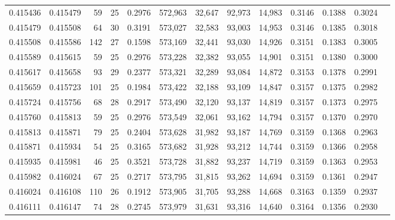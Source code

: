\begin{tabular}{rrrrrrrrrrrrr}
0.415436 & 0.415479 &    59 &  25 &                                     0.2976 & 572,963 &  32,647 &  92,973 &  14,983 & 0.3146 & 0.1388 & 0.3024 \\
0.415479 & 0.415508 &    64 &  30 &                                     0.3191 & 573,027 &  32,583 &  93,003 &  14,953 & 0.3146 & 0.1385 & 0.3018 \\
0.415508 & 0.415586 &   142 &  27 &                                     0.1598 & 573,169 &  32,441 &  93,030 &  14,926 & 0.3151 & 0.1383 & 0.3005 \\
0.415589 & 0.415615 &    59 &  25 &                                     0.2976 & 573,228 &  32,382 &  93,055 &  14,901 & 0.3151 & 0.1380 & 0.3000 \\
0.415617 & 0.415658 &    93 &  29 &                                     0.2377 & 573,321 &  32,289 &  93,084 &  14,872 & 0.3153 & 0.1378 & 0.2991 \\
0.415659 & 0.415723 &   101 &  25 &                                     0.1984 & 573,422 &  32,188 &  93,109 &  14,847 & 0.3157 & 0.1375 & 0.2982 \\
0.415724 & 0.415756 &    68 &  28 &                                     0.2917 & 573,490 &  32,120 &  93,137 &  14,819 & 0.3157 & 0.1373 & 0.2975 \\
0.415760 & 0.415813 &    59 &  25 &                                     0.2976 & 573,549 &  32,061 &  93,162 &  14,794 & 0.3157 & 0.1370 & 0.2970 \\
0.415813 & 0.415871 &    79 &  25 &                                     0.2404 & 573,628 &  31,982 &  93,187 &  14,769 & 0.3159 & 0.1368 & 0.2963 \\
0.415871 & 0.415934 &    54 &  25 &                                     0.3165 & 573,682 &  31,928 &  93,212 &  14,744 & 0.3159 & 0.1366 & 0.2958 \\
0.415935 & 0.415981 &    46 &  25 &                                     0.3521 & 573,728 &  31,882 &  93,237 &  14,719 & 0.3159 & 0.1363 & 0.2953 \\
0.415982 & 0.416024 &    67 &  25 &                                     0.2717 & 573,795 &  31,815 &  93,262 &  14,694 & 0.3159 & 0.1361 & 0.2947 \\
0.416024 & 0.416108 &   110 &  26 &                                     0.1912 & 573,905 &  31,705 &  93,288 &  14,668 & 0.3163 & 0.1359 & 0.2937 \\
0.416111 & 0.416147 &    74 &  28 &                                     0.2745 & 573,979 &  31,631 &  93,316 &  14,640 & 0.3164 & 0.1356 & 0.2930 \\

\end{tabular}

